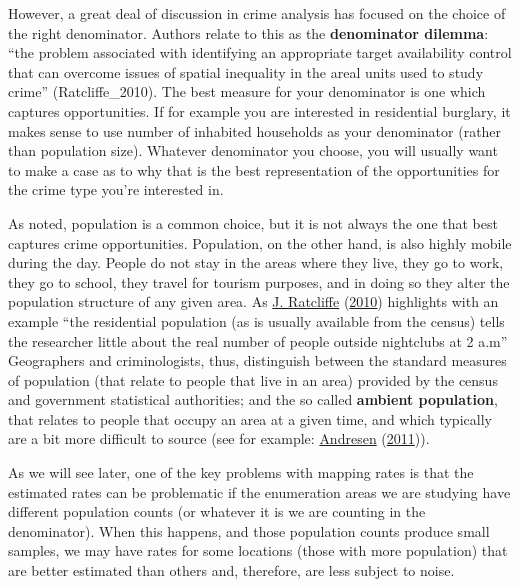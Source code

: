 \documentclass[
]{book}
\begin{document}
However, a great deal of discussion in crime analysis has focused on the choice of the right denominator. Authors relate to this as the \textbf{denominator dilemma}: ``the problem associated with identifying an appropriate target availability control that can overcome issues of spatial inequality in the areal units used to study crime'' (Ratcliffe\_2010). The best measure for your denominator is one which captures opportunities. If for example you are interested in residential burglary, it makes sense to use number of inhabited households as your denominator (rather than population size). Whatever denominator you choose, you will usually want to make a case as to why that is the best representation of the opportunities for the crime type you're interested in.

As noted, population is a common choice, but it is not always the one that best captures crime opportunities. Population, on the other hand, is also highly mobile during the day. People do not stay in the areas where they live, they go to work, they go to school, they travel for tourism purposes, and in doing so they alter the population structure of any given area. As \protect\hyperlink{ref-Ratcliffe_2010}{J. Ratcliffe} (\protect\hyperlink{ref-Ratcliffe_2010}{2010}) highlights with an example ``the residential population (as is usually available from the census) tells the researcher little about the real number of people outside nightclubs at 2 a.m'' Geographers and criminologists, thus, distinguish between the standard measures of population (that relate to people that live in an area) provided by the census and government statistical authorities; and the so called \textbf{ambient population}, that relates to people that occupy an area at a given time, and which typically are a bit more difficult to source (see for example: \protect\hyperlink{ref-Andresen_2011}{Andresen} (\protect\hyperlink{ref-Andresen_2011}{2011})).

As we will see later, one of the key problems with mapping rates is that the estimated rates can be problematic if the enumeration areas we are studying have different population counts (or whatever it is we are counting in the denominator). When this happens, and those population counts produce small samples, we may have rates for some locations (those with more population) that are better estimated than others and, therefore, are less subject to noise.
\end{document}
